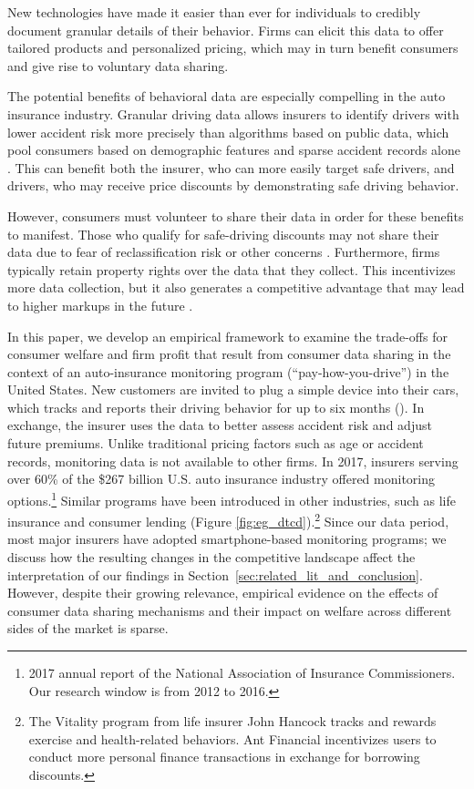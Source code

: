 New technologies have made it easier than ever for individuals to credibly document granular details of their behavior. Firms can elicit this data to offer tailored products and personalized pricing, which may in turn benefit consumers and give rise to voluntary data sharing.

The potential benefits of behavioral data are especially compelling in the auto insurance industry. Granular driving data allows insurers to identify drivers with lower accident risk more precisely than algorithms based on public data, which pool consumers based on demographic features and sparse accident records alone \parencite{Cohen2007}. This can benefit both the insurer, who can more easily target safe drivers, and drivers, who may receive price discounts by demonstrating safe driving behavior.

However, consumers must volunteer to share their data in order for these benefits to manifest. Those who qualify for safe-driving discounts may not share their data due to fear of reclassification risk or other concerns \parencite{Handel2015}. Furthermore, firms typically retain property rights over the data that they collect. This incentivizes more data collection, but it also generates a competitive advantage that may lead to higher markups in the future \parencite{jin2021big}.

In this paper, we develop an empirical framework to examine the trade-offs for consumer welfare and firm profit that result from consumer data sharing in the context of an auto-insurance {monitoring} program  (``pay-how-you-drive'') in the United States. New customers are invited to plug a simple device into their cars, which tracks and reports their driving behavior for up to six months (). In exchange, the insurer uses the data to better assess accident risk and adjust future premiums. Unlike traditional pricing factors such as age or accident records, monitoring data is not available to other firms. In 2017, insurers serving over 60\% of the \$267 billion U.S. auto insurance industry offered monitoring options.\footnote{\label{NAIC}2017 annual report of the National Association of Insurance Commissioners. Our research window is from 2012 to 2016.} Similar programs have been introduced in other industries, such as life insurance and consumer lending (Figure \ref{fig:eg_dtcd}).\footnote{The Vitality program from life insurer John Hancock tracks and rewards exercise and health-related behaviors. Ant Financial incentivizes users to conduct more personal finance transactions in exchange for borrowing discounts.} Since our data period, most major insurers have adopted smartphone-based monitoring programs; we discuss how the resulting changes in the competitive landscape affect the interpretation of our findings in Section~\ref{sec:related_lit_and_conclusion}. However, despite their growing relevance, empirical evidence on the effects of consumer data sharing mechanisms and their impact on welfare across different sides of the market is sparse.

